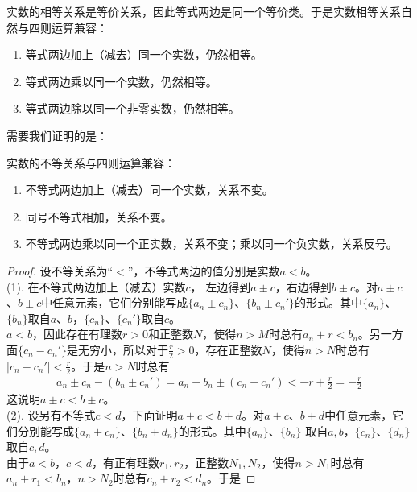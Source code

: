 \documentclass[12pt,UTF8,fontset=none]{ctexbook}
\begin{document}
\begin{appendix}
实数的相等关系是等价关系，因此等式两边是同一个等价类。于是实数相等关系自然与四则运算兼容：
\begin{tm}\label{tm:a-1-25}
    \begin{enumerate}
        \item 等式两边加上（减去）同一个实数，仍然相等。
        \item 等式两边乘以同一个实数，仍然相等。
        \item 等式两边除以同一个非零实数，仍然相等。
    \end{enumerate}
\end{tm}
需要我们证明的是：
\begin{tm}\label{tm:a-1-30}
    实数的不等关系与四则运算兼容：
    \begin{enumerate}
        \item 不等式两边加上（减去）同一个实数，关系不变。
        \item 同号不等式相加，关系不变。
        \item 不等式两边乘以同一个正实数，关系不变；乘以同一个负实数，关系反号。
    \end{enumerate}
\end{tm}
\begin{proof}
    设不等关系为“$<$”，不等式两边的值分别是实数$a<b$。\\
    (1). 在不等式两边加上（减去）实数$c$，
    左边得到$a\pm c$，右边得到$b\pm c$。对$a\pm c$、$b\pm c$中任意元素，它们分别能写成$\{a_n\pm c_n\}$、$\{b_n\pm c_n'\}$的形式。其中$\{a_n\}$、$\{b_n\}$取自$a$、$b$，$\{c_n\}$、$\{c_n'\}$取自$c$。\\%
    $a<b$，因此存在有理数$r>0$和正整数$N$，使得$n>M$时总有$a_n+r<b_n$。另一方面$\{c_n - c_n'\}$是无穷小，所以对于$\frac{r}{2}>0$，存在正整数$N$，使得$n>N$时总有$|c_n - c_n'| < \frac{r}{2}$。于是$n>N$时总有
    \begin{align*}
        a_n\pm c_n-(b_n\pm c_n') = a_n - b_n \pm  (c_n - c_n') < -r + \frac{r}{2} = -\frac{r}{2}
    \end{align*}
    这说明$a\pm c < b\pm c$。\\
    (2). 设另有不等式$c<d$，下面证明$a + c < b + d$。对$a + c$、$b + d$中任意元素，它们分别能写成$\{a_n + c_n\}$、$\{b_n + d_n\}$的形式。其中$\{a_n\}$、$\{b_n\}$
    取自$a,b$，$\{c_n\}$、$\{d_n\}$取自$c,d$。\\%
    由于$a < b$，$c < d$，有正有理数$r_1,r_2$，正整数$N_1,N_2$，使得$n>N_1$时总有$a_n + r_1 < b_n$，$n>N_2$时总有$c_n +r_2 < d_n$。于是

\end{proof}
\end{appendix}
\end{document}
